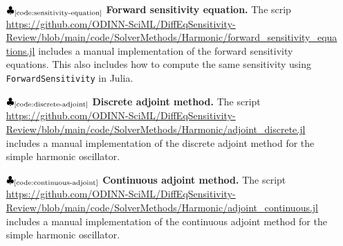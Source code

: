 \begin{itemize}
    \item[$\clubsuit_\text{\ref{code:sensitivity-equation}}$] \textbf{Forward sensitivity equation. } The scrip \url{https://github.com/ODINN-SciML/DiffEqSensitivity-Review/blob/main/code/SolverMethods/Harmonic/forward_sensitivity_equations.jl} includes a manual implementation of the  forward sensitivity equations. This also includes how to compute the same sensitivity using \texttt{ForwardSensitivity} in Julia. 
    \item[$\clubsuit_\text{\ref{code:discrete-adjoint}}$] \textbf{Discrete adjoint method. }The script \url{https://github.com/ODINN-SciML/DiffEqSensitivity-Review/blob/main/code/SolverMethods/Harmonic/adjoint_discrete.jl} includes a manual implementation of the discrete adjoint method for the simple harmonic oscillator. 
    
    \item[$\clubsuit_\text{\ref{code:continuous-adjoint}}$] \textbf{Continuous adjoint method. }The script \url{https://github.com/ODINN-SciML/DiffEqSensitivity-Review/blob/main/code/SolverMethods/Harmonic/adjoint_continuous.jl} includes a manual implementation of the continuous adjoint method for the simple harmonic oscillator. 
\end{itemize}